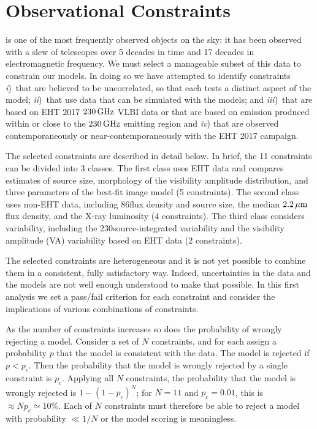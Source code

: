\section{Observational Constraints}\label{sec:observations}

\sgra is one of the most frequently observed objects on the sky: it has been observed with a slew of telescopes over 5 decades in time and 17 decades in electromagnetic frequency.
We must select a manageable subset of this data to constrain our models.
In doing so we have attempted to identify constraints 
\emph{i})~that are believed to be uncorrelated, so that each tests a distinct aspect of the model;
\emph{ii})~that use data that can be simulated with the models; and
\emph{iii})~that are based on EHT 2017 $230\,\mathrm{GHz}$ VLBI data or that are based on emission produced within or close to the $230\,\mathrm{GHz}$ emitting region and \emph{iv})
that are observed contemporaneously or near-contemporaneously with the EHT 2017 campaign.

The selected constraints are described in detail below.
In brief, the 11 constraints can be divided into 3 classes.
The first class uses EHT data and compares estimates of source size, morphology of the visibility amplitude distribution, and three parameters of the best-fit \mring image model (5 constraints).
The second class uses non-EHT data, including 86\GHz flux density and source size, the median $2.2\,\mu\mathrm{m}$ flux density, and the X-ray luminosity (4 constraints).
The third class considers variability, including the 230\GHz source-integrated variability and the visibility amplitude (VA) variability based on EHT data (2 constraints).

The selected constraints are heterogeneous and it is not yet possible to combine them in a consistent, fully satisfactory way.
Indeed, uncertainties in the data and the models are not well enough understood to make that possible.
In this first analysis we set a pass/fail criterion for each constraint and consider the implications of various combinations of constraints.

As the number of constraints increases so does the probability of wrongly rejecting a model.
Consider a set of $N$ constraints, and for each assign a probability $p$ that the model is consistent with the data.
The model is rejected if $p < p_c$.
Then the probability that the model is wrongly rejected by a single constraint is $p_c$.
Applying all $N$ constraints, the probability that the model is wrongly rejected is $1 - (1 - p_c)^N$; for $N = 11$ and $p_c = 0.01$, this is $\approx N p_c \simeq 10\%$.
Each of $N$ constraints must therefore be able to reject a model with probability $\ll 1/N$ or the model scoring is meaningless.

